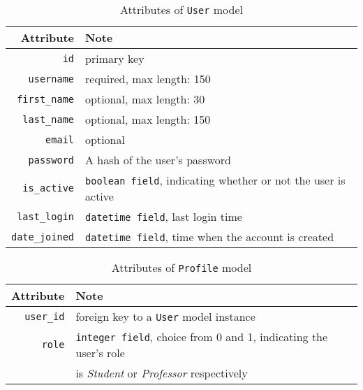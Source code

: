 \begin{table}[ht]
    \centering
    \caption{Attributes of \texttt{User} model}
    \label{tab:USR_ATTR}
    \renewcommand{\arraystretch}{1.3}
    \begin{tabular}[ht]{r|l}
        \hline
        Attribute & Note \\
        \hline
        \hline
        \texttt{id} & primary key \\
        \hline
        \texttt{username} &  required, max length: 150 \\
        \hline
        \texttt{first\_name} &  optional, max length: 30 \\
        \hline
        \texttt{last\_name} &  optional, max length: 150 \\
        \hline
        \texttt{email} & optional\\
        \hline
        \texttt{password} & A hash of the user's password \\
        \hline
        \texttt{is\_active} & \texttt{boolean field}, indicating whether or not the user
            is active \\
        \hline
        \texttt{last\_login} & \texttt{datetime field}, last login time \\
        \hline
        \texttt{date\_joined} & \texttt{datetime field}, time when the account is created \\
        \hline
    \end{tabular}
    \renewcommand{\arraystretch}{1}
\end{table}

\begin{table}[ht]
    \centering
    \caption{Attributes of \texttt{Profile} model}
    \label{tab:PROFILE_ATTR}
    \renewcommand{\arraystretch}{1.3}
    \begin{tabular}[ht]{r|p{4.5in}}
        \hline
        Attribute & Note \\
        \hline
        \hline
        \texttt{user\_id} & foreign key to a \texttt{User} model instance \\
        \hline
        \texttt{role} & \texttt{integer field}, choice from 0 and 1, indicating the
            user's role \\
           & is \emph{Student} or \emph{Professor} respectively \\
        \hline
    \end{tabular}
    \renewcommand{\arraystretch}{1}
\end{table}


